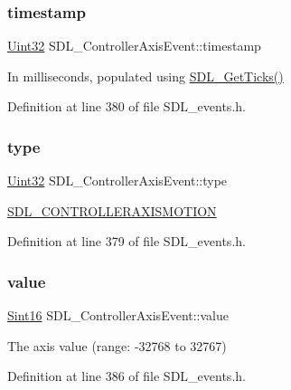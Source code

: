 \subsubsection{\texorpdfstring{timestamp}{timestamp}}
{\footnotesize\ttfamily \mbox{\hyperlink{_s_d_l__stdinc_8h_add440eff171ea5f55cb00c4a9ab8672d}{Uint32}} S\+D\+L\+\_\+\+Controller\+Axis\+Event\+::timestamp}

In milliseconds, populated using \mbox{\hyperlink{_s_d_l__timer_8h_a0b9bc71d6287e0ffafdc3419760fe2b3}{S\+D\+L\+\_\+\+Get\+Ticks()}} 

Definition at line 380 of file S\+D\+L\+\_\+events.\+h.

\mbox{\label{struct_s_d_l___controller_axis_event_aa904b61e4763d28d887cf8afcc3cbb7c}} 
\subsubsection{\texorpdfstring{type}{type}}
{\footnotesize\ttfamily \mbox{\hyperlink{_s_d_l__stdinc_8h_add440eff171ea5f55cb00c4a9ab8672d}{Uint32}} S\+D\+L\+\_\+\+Controller\+Axis\+Event\+::type}

\mbox{\hyperlink{_s_d_l__events_8h_a3b589e89be6b35c02e0dd34a55f3fccaaca6330126f4126f6a45454fa046c25f3}{S\+D\+L\+\_\+\+C\+O\+N\+T\+R\+O\+L\+L\+E\+R\+A\+X\+I\+S\+M\+O\+T\+I\+ON}} 

Definition at line 379 of file S\+D\+L\+\_\+events.\+h.

\mbox{\label{struct_s_d_l___controller_axis_event_a1ed7f14255ed01b982d40a38791d475a}} 
\subsubsection{\texorpdfstring{value}{value}}
{\footnotesize\ttfamily \mbox{\hyperlink{_s_d_l__stdinc_8h_a9d0257032c0e146ab6121bf0122712f5}{Sint16}} S\+D\+L\+\_\+\+Controller\+Axis\+Event\+::value}

The axis value (range\+: -\/32768 to 32767) 

Definition at line 386 of file S\+D\+L\+\_\+events.\+h.


